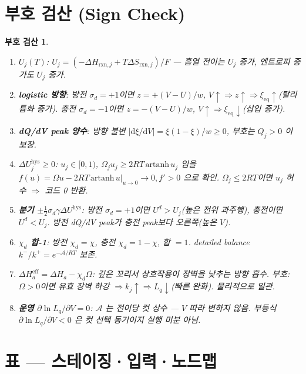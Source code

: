\documentclass[11pt,a4paper]{article}
\newtheorem*{signbox}{부호 검산}
\newcommand{\dd}{\mathrm{d}}
\newcommand{\eff}{\mathrm{eff}}
\newcommand{\eq}{\mathrm{eq}}
\newcommand{\rxn}{\mathrm{rxn}}
\newcommand{\hys}{\mathrm{hys}}
\begin{document}
\section*{부호 검산 (Sign Check)}\label{sec:signcheck}
\begin{signbox}
\begin{enumerate}[label=\textbf{S\arabic*.},leftmargin=*,itemsep=2pt]
\item \textbf{$U_j(T)$}: $U_j=(- \Delta H_{\rxn,j}+T\Delta S_{\rxn,j})/F$ — 흡열 전이는 $U_j$ 증가, 엔트로피 증가도 $U_j$ 증가. \checkmark
\item \textbf{logistic 방향}: 방전 $\sigma_d=+1$이면 $z=+(V-U)/w$, $V\!\uparrow\Rightarrow z\!\uparrow\Rightarrow\xi_\eq\!\uparrow$(탈리튬화 증가). 충전 $\sigma_d=-1$이면 $z=-(V-U)/w$, $V\!\uparrow\Rightarrow\xi_\eq\!\downarrow$(삽입 증가). \checkmark
\item \textbf{dQ/dV peak 양수}: 방향 불변 $|\dd\xi/\dd V|=\xi(1-\xi)/w\ge0$, 부호는 $Q_j>0$ 이 보장. \checkmark
\item \textbf{$\Delta U_j^\hys\ge0$}: $u_j\in[0,1)$, $\Omega_j u_j\ge2RT\,\mathrm{artanh}\,u_j$ 임을 $f(u)=\Omega u-2RT\,\mathrm{artanh}\,u|_{u\to0}\to0, f'>0$ 으로 확인. $\Omega_j\le2RT$이면 $u_j$ 허수 $\Rightarrow$ 코드 0 반환. \checkmark
\item \textbf{분기 $\pm\frac12\sigma_d\gamma\Delta U^\hys$}: 방전 $\sigma_d=+1$이면 $U^d>U_j$(높은 전위 과주행), 충전이면 $U^d<U_j$. 방전 dQ/dV peak가 충전 peak보다 오른쪽(높은 $V$). \checkmark
\item \textbf{$\chi_d$ 합-1}: 방전 $\chi_d=\chi$, 충전 $\chi_d=1-\chi$, 합 $=1$. detailed balance $k^-/k^+=e^{-\mathcal A/RT}$ 보존. \checkmark
\item \textbf{$\Delta H_a^\eff=\Delta H_a-\chi_d\Omega$}: 깊은 꼬리서 상호작용이 장벽을 낮추는 방향 흡수. 부호: $\Omega>0$이면 유효 장벽 하강 $\Rightarrow k_j\uparrow\Rightarrow L_q\downarrow$(빠른 완화). 물리적으로 일관. \checkmark
\item \textbf{운영 $\partial\ln L_q/\partial V=0$}: $\mathcal A$ 는 전이당 컷 상수 — $V$ 따라 변하지 않음. 부등식 $\partial\ln L_q/\partial V<0$ 은 컷 선택 동기이지 실행 미분 아님. \checkmark
\end{enumerate}
\end{signbox}

\section{표 — 스테이징·입력·노드맵}\label{sec:tables}
\end{document}
